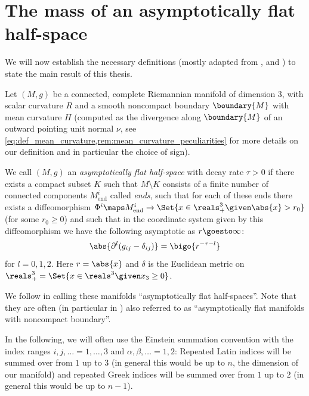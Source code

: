 \documentclass[titlepage,numbers=noenddot,oneside,%
cleardoublepage=empty,paper=a4,fontsize=11pt,%
english,%
]{scrartcl}
\begin{document}
\section{The mass of an asymptotically flat half-space}
We will now establish the necessary definitions (mostly adapted from \cite{almarazPositiveMassTheorem2016}, \cite{eichmairDoublingAsymptoticallyFlat2023} and \cite{brayHarmonicFunctionsMass2019}) to state the main result of this thesis.
\begin{definition}\label{def:asymptotically_flat_half_space}
    Let \( (M,g) \) be a connected, complete Riemannian manifold of dimension 3, with scalar curvature \( R \) and a smooth noncompact boundary \( \boundary{M} \) with mean curvature \( H \) (computed as the divergence along \( \boundary{M} \) of an outward pointing unit normal \( \nu \), see \cref{eq:def_mean_curvature,rem:mean_curvature_peculiarities} for more details on our definition and in particular the choice of sign).

    We call \((M,g) \) an \emph{asymptotically flat half-space} with decay rate \( \tau>0 \) if there exists a compact subset \( K \) such that \( M\setminus K \) consists of a finite number of connected components \(M_{\mathrm{end}}^i \) called \emph{ends}, such that for each of these ends there exists a diffeomorphism \( \Phi^i\maps M_{\mathrm{end}}^i \to \Set{x\in \reals^3_+\given \abs{x}>r_0} \) (for some \( r_0\geq 0 \)) and such that in the coordinate system given by this diffeomorphism we have the following asymptotic as \( r\goesto \infty \):
    \begin{equation}
        \abs{\partial^l(g_{ij}-\delta_{ij})}=\bigo{r^{-\tau-l}}\label{eq:def_asymptotically_flat}
    \end{equation}
    for \( l=0,1,2 \). Here \( r=\abs{x} \) and \( \delta \) is the Euclidean metric on \( \reals^3_+=\Set{x\in \reals^3\given x_3\geq 0} \). 
\end{definition}
\begin{remark}
    We follow \textcite{eichmairDoublingAsymptoticallyFlat2023} in calling these manifolds \enquote{asymptotically flat half-spaces}. Note that they are often (in particular in \cite{almarazPositiveMassTheorem2016}) also referred to as \enquote{asymptotically flat manifolds with noncompact boundary}.
\end{remark}
\begin{notation}
    In the following, we will often use the Einstein summation convention with the index ranges \( i,j,\dotsc=1,\dotsc,3\) and \( \alpha,\beta,\dotsc=1,2 \): Repeated Latin indices will be summed over from \( 1  \) up to \( 3 \) (in general this would be up to \( n \), the dimension of our manifold) and repeated Greek indices will be summed over from \( 1 \) up to \( 2 \) (in general this would be up to \( n-1\)).
\end{notation}
\end{document}
